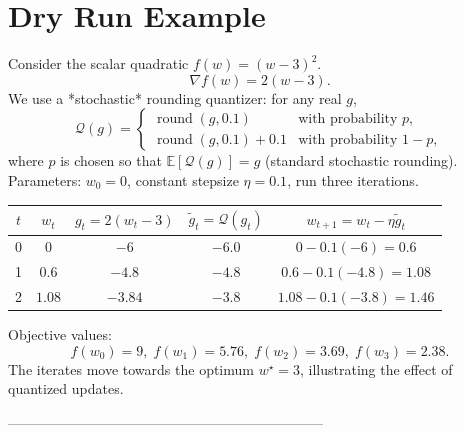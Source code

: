 \documentclass{article}
\newcommand{\E}{\mathbb{E}}
\newcommand{\Q}{\mathcal{Q}}
\begin{document}
\section*{Dry Run Example}
Consider the scalar quadratic $f(w)=(w-3)^2$.
\[
\nabla f(w)=2(w-3).
\]
We use a *stochastic* rounding quantizer: for any real $g$,
\[
\Q(g)=
\begin{cases}
\operatorname{round}(g,0.1)      &\text{with probability }p,\\[4pt]
\operatorname{round}(g,0.1)+0.1 &\text{with probability }1-p,
\end{cases}
\]
where $p$ is chosen so that $\E[\Q(g)]=g$ (standard stochastic rounding).  
Parameters: $w_0=0$, constant stepsize $\eta=0.1$, run three iterations.

\begin{center}
\begin{tabular}{c|c|c|c|c}
$t$ & $w_t$ & $g_t=2(w_t-3)$ & $\tilde g_t=\Q(g_t)$ & $w_{t+1}=w_t-\eta\tilde g_t$ \\ \hline
0 & $0$   & $-6$   & $-6.0$ & $0-0.1(-6)=0.6$ \\
1 & $0.6$ & $-4.8$ & $-4.8$ & $0.6-0.1(-4.8)=1.08$ \\
2 & $1.08$& $-3.84$& $-3.8$ & $1.08-0.1(-3.8)=1.46$ \\
\end{tabular}
\end{center}

Objective values:
\[
f(w_0)=9,\; f(w_1)=5.76,\; f(w_2)=3.69,\; f(w_3)=2.38.
\]
The iterates move towards the optimum $w^\star=3$, illustrating the effect of quantized updates.

--------------------------------------------------------------------
\end{document}
